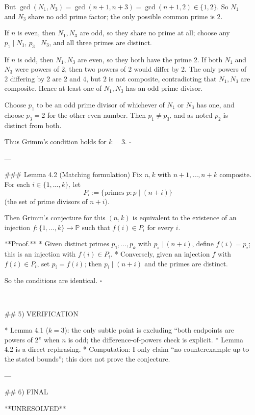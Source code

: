 But \(\gcd(N_1,N_3)=\gcd(n+1,n+3)=\gcd(n+1,2)\in\{1,2\}\).
So \(N_1\) and \(N_3\) share no odd prime factor; the only possible common prime is 2.

If \(n\) is even, then \(N_1,N_3\) are odd, so they share no prime at all; choose any
\(p_1\mid N_1\), \(p_3\mid N_3\), and all three primes are distinct.

If \(n\) is odd, then \(N_1,N_3\) are even, so they both have the prime 2.
If both \(N_1\) and \(N_3\) were powers of 2, then two powers of 2 would differ by 2.
The only powers of 2 differing by 2 are \(2\) and \(4\), but \(2\) is not composite, contradicting
that \(N_1,N_3\) are composite. Hence at least one of \(N_1,N_3\) has an odd prime divisor.

Choose \(p_1\) to be an odd prime divisor of whichever of \(N_1\) or \(N_3\) has one, and choose
\(p_3=2\) for the other even number. Then \(p_1\ne p_3\), and as noted \(p_2\) is distinct from both.

Thus Grimm’s condition holds for \(k=3\). \(\square\)

---

### Lemma 4.2 (Matching formulation)
Fix \(n,k\) with \(n+1,\dots,n+k\) composite.
For each \(i\in\{1,\dots,k\}\), let
\[
P_i := \{\text{primes }p : p\mid (n+i)\}
\]
(the set of prime divisors of \(n+i\)).

Then Grimm’s conjecture for this \((n,k)\) is equivalent to the existence of an injection
\(f:\{1,\dots,k\}\to\mathbb P\) such that \(f(i)\in P_i\) for every \(i\).

**Proof.**
* Given distinct primes \(p_1,\dots,p_k\) with \(p_i\mid(n+i)\), define \(f(i)=p_i\); this is an injection
  with \(f(i)\in P_i\).
* Conversely, given an injection \(f\) with \(f(i)\in P_i\), set \(p_i=f(i)\); then \(p_i\mid(n+i)\)
  and the primes are distinct.

So the conditions are identical. \(\square\)

---

## 5) VERIFICATION

* Lemma 4.1 (\(k=3\)): the only subtle point is excluding “both endpoints are powers of 2” when
  \(n\) is odd; the difference-of-powers check is explicit.
* Lemma 4.2 is a direct rephrasing.
* Computation: I only claim “no counterexample up to the stated bounds”; this does not prove the
  conjecture.

---

## 6) FINAL

**UNRESOLVED**

